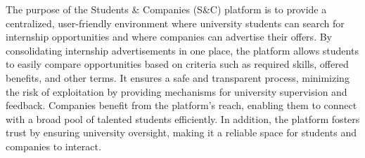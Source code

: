 The purpose of the Students \& Companies (S\&C) platform is to provide a centralized, user-friendly environment where university students can search for internship opportunities and where companies can advertise their offers. By consolidating internship advertisements in one place, the platform allows students to easily compare opportunities based on criteria such as required skills, offered benefits, and other terms. It ensures a safe and transparent process, minimizing the risk of exploitation by providing mechanisms for university supervision and feedback. Companies benefit from the platform’s reach, enabling them to connect with a broad pool of talented students efficiently. In addition, the platform fosters trust by ensuring university oversight, making it a reliable space for students and companies to interact.
